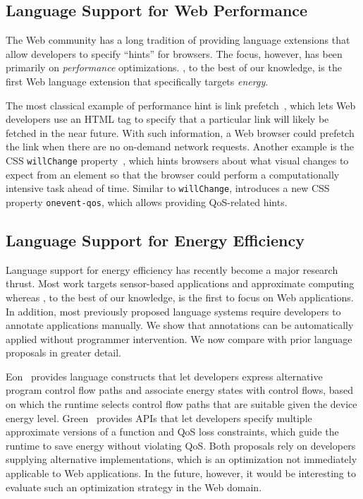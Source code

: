 \subsection{Language Support for Web Performance}
\label{sec:lang:related:perf}

The Web community has a long tradition of providing language extensions that allow developers to specify ``hints'' for browsers. The focus, however, has been primarily on \textit{performance} optimizations. \greenweb, to the best of our knowledge, is the first Web language extension that specifically targets \textit{energy}.

The most classical example of performance hint is link prefetch~\cite{linkprefetch}, which lets Web developers use an HTML tag to specify that a particular link will likely be fetched in the near future. With such information, a Web browser could prefetch the link when there are no on-demand network requests. Another example is the CSS \texttt{willChange} property~\cite{csswillchange}, which hints browsers about what visual changes to expect from an element so that the browser could perform a computationally intensive task ahead of time. Similar to \texttt{willChange}, \greenweb introduces a new CSS property \texttt{onevent-qos}, which allows providing QoS-related hints.

\subsection{Language Support for Energy Efficiency}
\label{sec:lang:related:energy}

Language support for energy efficiency has recently become a major research thrust. Most work targets sensor-based applications and approximate computing whereas \greenweb, to the best of our knowledge, is the first to focus on Web applications. In addition, most previously proposed language systems require developers to annotate applications manually. We show that \greenweb annotations can be automatically applied without programmer intervention. We now compare \greenweb with prior language proposals in greater detail.

Eon~\cite{eon} provides language constructs that let developers express alternative program control flow paths and associate energy states with control flows, based on which the runtime selects control flow paths that are suitable given the device energy level. Green~\cite{green} provides APIs that let developers specify multiple approximate versions of a function and QoS loss constraints, which guide the runtime to save energy without violating QoS. Both proposals rely on developers supplying alternative implementations, which is an optimization not immediately applicable to Web applications. In the future, however, it would be interesting to evaluate such an optimization strategy in the Web domain.

